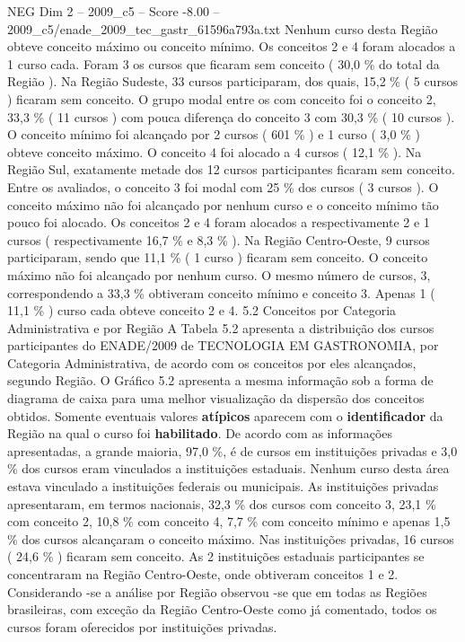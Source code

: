 \begin{textsample}{NEG Dim 2 – 2009\_c5 – Score -8.00 – 2009\_c5/enade\_2009\_tec\_gastr\_61596a793a.txt}
Nenhum curso desta Região obteve conceito máximo ou conceito mínimo.
Os conceitos 2 e 4 foram alocados a 1 curso cada.
Foram 3 os cursos que ficaram sem conceito ( 30,0 \% do total da Região ).
Na Região Sudeste, 33 cursos participaram, dos quais, 15,2 \% ( 5 cursos ) ficaram sem conceito.
O grupo modal entre os com conceito foi o conceito 2, 33,3 \% ( 11 cursos ) com pouca diferença do conceito 3 com 30,3 \% ( 10 cursos ).
O conceito mínimo foi alcançado por 2 cursos ( 601 \% ) e 1 curso ( 3,0 \% ) obteve conceito máximo.
O conceito 4 foi alocado a 4 cursos ( 12,1 \% ).
Na Região Sul, exatamente metade dos 12 cursos participantes ficaram sem conceito.
Entre os avaliados, o conceito 3 foi modal com 25 \% dos cursos ( 3 cursos ).
O conceito máximo não foi alcançado por nenhum curso e o conceito mínimo tão pouco foi alocado.
Os conceitos 2 e 4 foram alocados a respectivamente 2 e 1 cursos ( respectivamente 16,7 \% e 8,3 \% ).
Na Região Centro-Oeste, 9 cursos participaram, sendo que 11,1 \% ( 1 curso ) ficaram sem conceito.
O conceito máximo não foi alcançado por nenhum curso.
O mesmo número de cursos, 3, correspondendo a 33,3 \% obtiveram conceito mínimo e conceito 3.
Apenas 1 ( 11,1 \% ) curso cada obteve conceito 2 e 4. 5.2 Conceitos por Categoria Administrativa e por Região A Tabela 5.2 apresenta a distribuição dos cursos participantes do ENADE/2009 de TECNOLOGIA EM GASTRONOMIA, por Categoria Administrativa, de acordo com os conceitos por eles alcançados, segundo Região.
O Gráfico 5.2 apresenta a mesma informação sob a forma de diagrama de caixa para uma melhor visualização da dispersão dos conceitos obtidos.
Somente eventuais valores \textbf{atípicos} aparecem com o \textbf{identificador} da Região na qual o curso foi \textbf{habilitado}.
De acordo com as informações apresentadas, a grande maioria, 97,0 \%, é de cursos em instituições privadas e 3,0 \% dos cursos eram vinculados a instituições estaduais.
Nenhum curso desta área estava vinculado a instituições federais ou municipais.
As instituições privadas apresentaram, em termos nacionais, 32,3 \% dos cursos com conceito 3, 23,1 \% com conceito 2, 10,8 \% com conceito 4, 7,7 \% com conceito mínimo e apenas 1,5 \% dos cursos alcançaram o conceito máximo.
Nas instituições privadas, 16 cursos ( 24,6 \% ) ficaram sem conceito.
As 2 instituições estaduais participantes se concentraram na Região Centro-Oeste, onde obtiveram conceitos 1 e 2.
Considerando -se a análise por Região observou -se que em todas as Regiões brasileiras, com exceção da Região Centro-Oeste como já comentado, todos os cursos foram oferecidos por instituições privadas.

\end{textsample}
